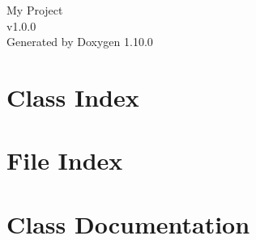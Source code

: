 \documentclass[twoside]{book}
\newcommand{\+}{\discretionary{\mbox{\scriptsize$\hookleftarrow$}}{}{}}
\newcommand{\clearemptydoublepage}{%
    \newpage{\pagestyle{empty}\cleardoublepage}%
  }
\begin{document}
  \raggedbottom
    \hypersetup{pageanchor=false,
                bookmarksnumbered=true,
                pdfencoding=unicode
               }
  \begin{titlepage}
  \vspace*{7cm}
  \begin{center}%
  {\Large My Project}\\
  [1ex]\large v1.\+0.\+0 \\
  \vspace*{1cm}
  {\large Generated by Doxygen 1.10.0}\\
  \end{center}
  \end{titlepage}
  \clearemptydoublepage
  \tableofcontents
  \clearemptydoublepage
  \hypersetup{pageanchor=true}
\chapter{Class Index}

\chapter{File Index}

\chapter{Class Documentation}
















































\end{document}
